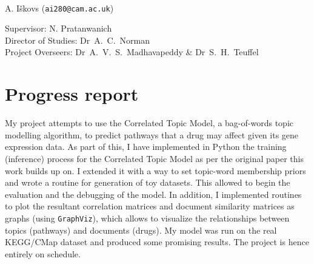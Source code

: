 \documentclass[12pt,a4]{article}
\begin{document}
\begin{center}

\textbf{}\\
A. I\v{s}kovs (\texttt{ai280@cam.ac.uk})\\
\vspace{0.3in}

Supervisor: N. Pratanwanich\\
Director of Studies: Dr~A.~C.~Norman\\
Project Overseers: Dr~A.~V.~S.~Madhavapeddy  \& Dr~S.~H.~Teuffel\\

\end{center}


\section*{Progress report}

My project attempts to use the Correlated Topic Model, a bag-of-words topic modelling algorithm, to predict pathways that a drug may affect given its gene expression data. As part of this, I have implemented in Python the training (inference) process for the Correlated Topic Model as per the original paper this work builds up on. I extended it with a way to set topic-word membership priors and wrote a routine for generation of toy datasets. This allowed to begin the evaluation and the debugging of the model. In addition, I implemented routines to plot the resultant correlation matrices and document similarity matrices as graphs (using \texttt{GraphViz}), which allows to visualize the relationships between topics (pathways) and documents (drugs). My model was run on the real KEGG/CMap dataset and produced some promising results. The project is hence entirely on schedule.
\end{document}
